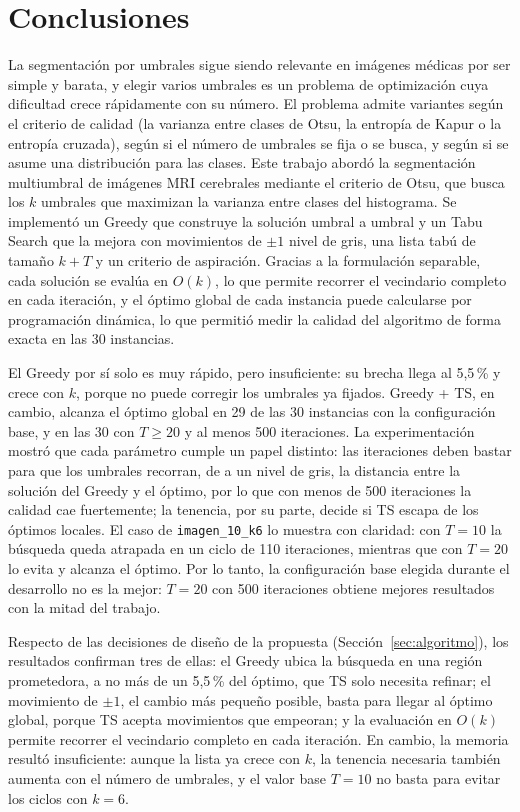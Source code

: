 \documentclass[letter, 10pt]{article}
\begin{document}
\section{Conclusiones}
\label{sec:conclusiones}
La segmentación por umbrales sigue siendo relevante en imágenes médicas por ser simple y barata, y elegir varios umbrales es un problema de optimización cuya dificultad crece rápidamente con su número. El problema admite variantes según el criterio de calidad (la varianza entre clases de Otsu, la entropía de Kapur o la entropía cruzada), según si el número de umbrales se fija o se busca, y según si se asume una distribución para las clases. Este trabajo abordó la segmentación multiumbral de imágenes MRI cerebrales mediante el criterio de Otsu, que busca los $k$ umbrales que maximizan la varianza entre clases del histograma. Se implementó un Greedy que construye la solución umbral a umbral y un Tabu Search que la mejora con movimientos de $\pm 1$ nivel de gris, una lista tabú de tamaño $k + T$ y un criterio de aspiración. Gracias a la formulación separable, cada solución se evalúa en $O(k)$, lo que permite recorrer el vecindario completo en cada iteración, y el óptimo global de cada instancia puede calcularse por programación dinámica, lo que permitió medir la calidad del algoritmo de forma exacta en las 30 instancias.

El Greedy por sí solo es muy rápido, pero insuficiente: su brecha llega al 5,5\,\% y crece con $k$, porque no puede corregir los umbrales ya fijados. Greedy + TS, en cambio, alcanza el óptimo global en 29 de las 30 instancias con la configuración base, y en las 30 con $T \geq 20$ y al menos 500 iteraciones. La experimentación mostró que cada parámetro cumple un papel distinto: las iteraciones deben bastar para que los umbrales recorran, de a un nivel de gris, la distancia entre la solución del Greedy y el óptimo, por lo que con menos de 500 iteraciones la calidad cae fuertemente; la tenencia, por su parte, decide si TS escapa de los óptimos locales. El caso de \texttt{imagen\_10\_k6} lo muestra con claridad: con $T = 10$ la búsqueda queda atrapada en un ciclo de 110 iteraciones, mientras que con $T = 20$ lo evita y alcanza el óptimo. Por lo tanto, la configuración base elegida durante el desarrollo no es la mejor: $T = 20$ con 500 iteraciones obtiene mejores resultados con la mitad del trabajo.

Respecto de las decisiones de diseño de la propuesta (Sección~\ref{sec:algoritmo}), los resultados confirman tres de ellas: el Greedy ubica la búsqueda en una región prometedora, a no más de un 5,5\,\% del óptimo, que TS solo necesita refinar; el movimiento de $\pm 1$, el cambio más pequeño posible, basta para llegar al óptimo global, porque TS acepta movimientos que empeoran; y la evaluación en $O(k)$ permite recorrer el vecindario completo en cada iteración. En cambio, la memoria resultó insuficiente: aunque la lista ya crece con $k$, la tenencia necesaria también aumenta con el número de umbrales, y el valor base $T = 10$ no basta para evitar los ciclos con $k = 6$.
\end{document}
